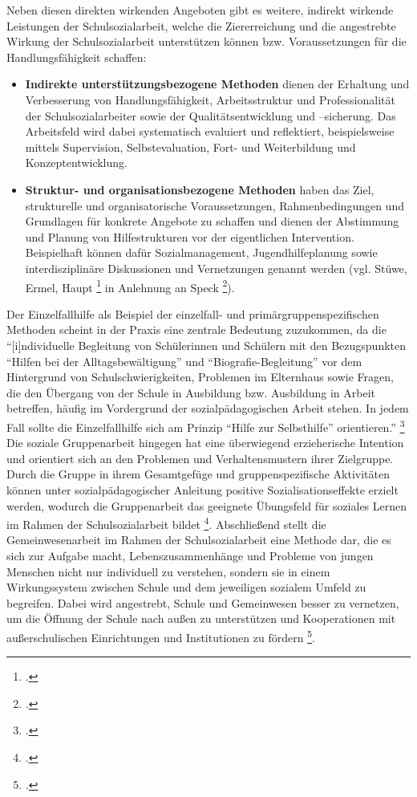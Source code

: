 \noindent
Neben diesen direkten wirkenden Angeboten gibt es weitere, indirekt wirkende Leistungen der Schulsozialarbeit, welche die Ziererreichung und die angestrebte Wirkung der Schulsozialarbeit unterstützen können bzw. Voraussetzungen für die Handlungsfähigkeit schaffen:\\
\begin{itemize}
	\item \textbf{Indirekte unterstützungsbezogene Methoden} dienen der Erhaltung und Verbesserung von Handlungsfähigkeit, Arbeitsstruktur und Professionalität der Schulsozialarbeiter sowie der Qualitätsentwicklung und –sicherung. Das Arbeitsfeld wird dabei systematisch evaluiert und reflektiert, beispielsweise mittels Supervision, Selbstevaluation, Fort- und Weiterbildung und Konzeptentwicklung. 
	\item \textbf{Struktur- und organisationsbezogene Methoden} haben das Ziel, strukturelle und organisatorische Voraussetzungen, Rahmenbedingungen und Grundlagen für konkrete Angebote zu schaffen und dienen der Abstimmung und Planung von Hilfestrukturen vor der eigentlichen Intervention. Beispielhaft können dafür Sozialmanagement, Jugendhilfeplanung sowie interdisziplinäre Diskussionen und Vernetzungen genannt werden (vgl. Stüwe, Ermel, Haupt \footcite[vgl.][96ff]{Stuewe2015} in Anlehnung an Speck \footcite[vgl.][64f]{Speck2007}).
\end{itemize}

\noindent 
Der Einzelfallhilfe als Beispiel der einzelfall- und primärgruppenspezifischen Methoden scheint in der Praxis eine zentrale Bedeutung zuzukommen, da die "`[i]ndividuelle Begleitung von Schülerinnen und Schülern mit den Bezugspunkten "`Hilfen bei der Alltagsbewältigung"' und "`Biografie-Begleitung"' vor dem Hintergrund von Schulschwierigkeiten, Problemen im Elternhaus sowie Fragen, die den Übergang von der Schule in Ausbildung bzw. Ausbildung in Arbeit betreffen, häufig im Vordergrund der sozialpädagogischen Arbeit stehen. In jedem Fall sollte die Einzelfallhilfe sich am Prinzip "`Hilfe zur Selbsthilfe"' orientieren."' \footcite[23]{SMSSS2009} Die soziale Gruppenarbeit hingegen hat eine überwiegend erzieherische Intention und orientiert sich an den Problemen und Verhaltensmustern ihrer Zielgruppe. Durch die Gruppe in ihrem Gesamtgefüge und gruppenspezifische Aktivitäten können unter sozialpädagogischer Anleitung positive Sozialisationseffekte erzielt werden, wodurch die Gruppenarbeit das geeignete Übungsfeld für soziales Lernen im Rahmen der Schulsozialarbeit bildet \footcite[vgl.][24]{SMSSS2009}. Abschließend stellt die Gemeinwesenarbeit im Rahmen der Schulsozialarbeit eine Methode dar, die es sich zur Aufgabe macht, Lebenszusammenhänge und Probleme von jungen Menschen nicht nur individuell zu verstehen, sondern sie in einem Wirkungssystem zwischen Schule und dem jeweiligen sozialem Umfeld zu begreifen. Dabei wird angestrebt, Schule und Gemeinwesen besser zu vernetzen, um die Öffnung der Schule nach außen zu unterstützen und Kooperationen mit außerschulischen Einrichtungen und Institutionen zu fördern \footcite[vgl.][25]{SMSSS2009}. 

